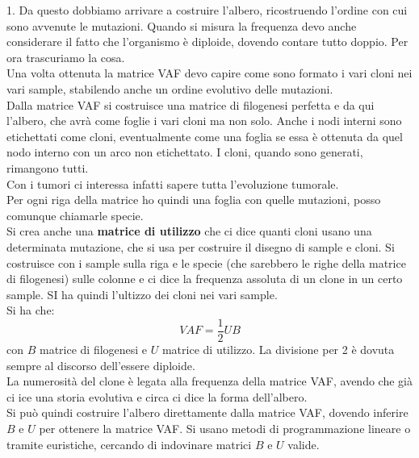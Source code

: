 \documentclass[a4paper,12pt, oneside]{book}
\begin{document}
1. Da questo dobbiamo arrivare a costruire l'albero, ricostruendo l'ordine con
cui sono avvenute le mutazioni. Quando si misura la frequenza devo anche
considerare il fatto che l'organismo è diploide, dovendo contare tutto
doppio. Per ora trascuriamo la cosa.\\
Una volta ottenuta la matrice VAF devo capire come sono formato i vari cloni nei
vari sample, stabilendo anche un ordine evolutivo delle mutazioni.\\
Dalla matrice VAF si costruisce una matrice di filogenesi perfetta e da qui
l'albero, che avrà come foglie i vari cloni ma non solo. Anche i nodi interni
sono etichettati come cloni, eventualmente come una foglia se essa è ottenuta da
quel nodo interno con un arco non etichettato. I cloni, quando sono generati,
rimangono tutti.\\ 
Con i tumori ci interessa infatti sapere tutta l'evoluzione tumorale.\\
Per ogni riga della matrice ho quindi una foglia con quelle mutazioni, posso
comunque chiamarle specie.\\
Si crea anche una \textbf{matrice di utilizzo} che ci dice quanti cloni usano
una determinata mutazione, che si usa per costruire il disegno di sample e
cloni. Si costruisce con i sample sulla riga e le specie (che sarebbero le righe
della matrice di filogenesi) sulle colonne e ci dice
la frequenza assoluta di un clone in un certo sample. SI ha quindi l'ultizzo dei
cloni nei vari sample. \\
Si ha che:
\[VAF=\frac{1}{2}UB\]
con $B$ matrice di filogenesi e $U$ matrice di utilizzo. La divisione per 2 è
dovuta sempre al discorso dell'essere diploide.\\
La numerosità del clone è legata alla frequenza della matrice VAF, avendo che
già ci ice una storia evolutiva e circa ci dice la forma dell'albero. \\
Si può quindi costruire l'albero direttamente dalla matrice VAF, dovendo
inferire $B$ e $U$ per ottenere la matrice VAF. Si usano metodi di
programmazione lineare o tramite euristiche, cercando di indovinare matrici $B$
e $U$ valide.
\end{document}
